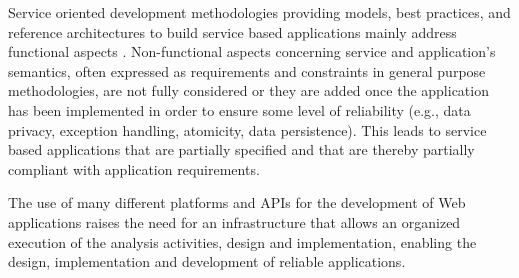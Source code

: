 Service oriented development methodologies providing models, best practices, and
reference architectures to build service based applications mainly address 
functional aspects \cite{Arsanjani:2008,2,decastro1,PapazoglouH06}. Non-functional aspects
concerning service and application's semantics, often expressed as
requirements and constraints in general purpose methodologies, are not fully
considered or they are added once the application has been implemented in order
to ensure some level of reliability (e.g., data privacy, exception handling,
atomicity, data persistence). This leads to service based applications that are
partially specified and that are thereby partially compliant with application
requirements.        


The use of many different platforms and APIs for the development of
Web applications raises the need for an infrastructure that
allows an organized execution of the analysis activities, design and
implementation, enabling the design, implementation and development
of reliable applications. 


